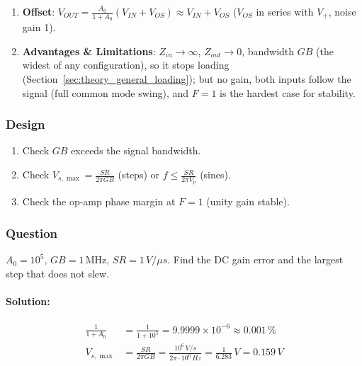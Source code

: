\begin{enumerate}
    \(R_o\) adds a pole \(p_L = \frac{1}{R_o C_L}\) inside the loop (\(F = 1\)):
    \begin{align*}
      A(s)F &= \frac{A_0 p_1}{s + p_1}\cdot\frac{1}{1 + \frac{s}{p_L}} \hspace{1cm} |AF| = 1 \text{ at } \omega \approx 2\pi GB \hspace{0.5cm} [p_1 \ll 2\pi GB \ll p_L] \\
      PM &= 180^\circ - 90^\circ - \tan^{-1}\frac{2\pi GB}{p_L} = 90^\circ - \tan^{-1}(2\pi GB\, R_o C_L)
    \end{align*}
    e.g.\ \(GB = 1\,\)MHz, \(R_o = 100\,\Omega\), \(C_L = 1\,\)nF: \(2\pi \cdot 10^6 \cdot 100 \cdot 10^{-9} = 0.628\), \(PM = 90^\circ - 32.1^\circ = 57.9^\circ\).
    An isolation resistor in series with \(C_L\) restores it.
  \item \textbf{Offset}: \(V_{OUT} = \frac{A_0}{1 + A_0}(V_{IN} + V_{OS}) \approx V_{IN} + V_{OS}\) (\(V_{OS}\) in series with \(V_+\), noise gain 1).
  \item \textbf{Advantages \& Limitations}: \(Z_{in} \to \infty\), \(Z_{out} \to 0\),
    bandwidth \(GB\) (the widest of any configuration), so it stops loading
    (Section~\ref{sec:theory_general_loading}); but no gain, both inputs follow
    the signal (full common mode swing), and \(F = 1\) is the hardest case for stability.
\end{enumerate}

\subsubsection{Design}
\begin{enumerate}
  \item Check \(GB\) exceeds the signal bandwidth.
  \item Check \(V_{s,\max} = \frac{SR}{2\pi GB}\) (steps) or \(f \leq \frac{SR}{2\pi V_p}\) (sines).
  \item Check the op-amp phase margin at \(F = 1\) (unity gain stable).
\end{enumerate}

\subsubsection{Question}
\(A_0 = 10^5\), \(GB = 1\,\)MHz, \(SR = 1\,V/\mu s\). Find the DC gain error and
the largest step that does not slew.
\paragraph{Solution:}
\begin{align*}
  \frac{1}{1 + A_0} &= \frac{1}{1 + 10^5} = 9.9999 \times 10^{-6} \approx 0.001\,\% \\
  V_{s,\max} &= \frac{SR}{2\pi GB} = \frac{10^6\,V/s}{2\pi \cdot 10^6\,Hz} = \frac{1}{6.283}\,V = 0.159\,V
\end{align*}

